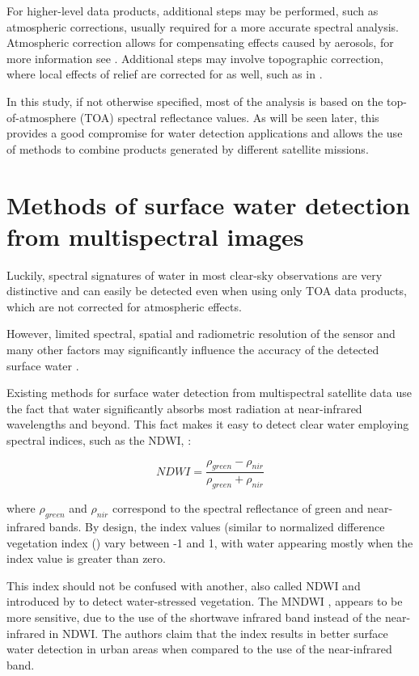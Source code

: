 For higher-level data products, additional steps may be performed, such as atmospheric corrections, usually required for a more accurate spectral analysis. Atmospheric correction allows for compensating effects caused by aerosols, for more information see \citet{gao2006review}. Additional steps may involve topographic correction, where local effects of relief are corrected for as well, such as in \citet{tan2013improved}.

In this study, if not otherwise specified, most of the analysis is based on the top-of-atmosphere (TOA) spectral reflectance values. As will be seen later, this provides a good compromise for water detection applications and allows the use of methods to combine products generated by different satellite missions. 

\section{Methods of surface water detection from multispectral images}

Luckily, spectral signatures of water in most clear-sky observations are very distinctive and can easily be detected even when using only TOA data products, which are not corrected for atmospheric effects.

However, limited spectral, spatial and radiometric resolution of the sensor and many other factors may significantly influence the accuracy of the detected surface water \citet{Ji2009}. 

Existing methods for surface water detection from multispectral satellite data use the fact that water significantly absorbs most radiation at near-infrared wavelengths and beyond. This fact makes it easy to detect clear water employing spectral indices, such as the \gls{NDWI}, \citet{McFeeters1996}:

\begin{equation}
NDWI =  \frac{\rho_{green} - \rho_{nir}}{\rho_{green} + \rho_{nir}} 
\label{eq:index_NDWI}
\end{equation}

where $\rho_{green}$ and $\rho_{nir}$ correspond to the spectral reflectance of green and near-infrared bands. By design, the index values (similar to normalized difference vegetation index (\citet{rouse1974monitoring}) vary between -1 and 1, with water appearing mostly when the index value is greater than zero.

This index should not be confused with another, also called \gls{NDWI} and introduced by \citet{Gao1996} to detect water-stressed vegetation. The \gls{MNDWI} \citet{Xu2006}, appears to be more sensitive, due to the use of the shortwave infrared band instead of the near-infrared in \gls{NDWI}. The authors claim that the index results in better surface water detection in urban areas when compared to the use of the near-infrared band.

